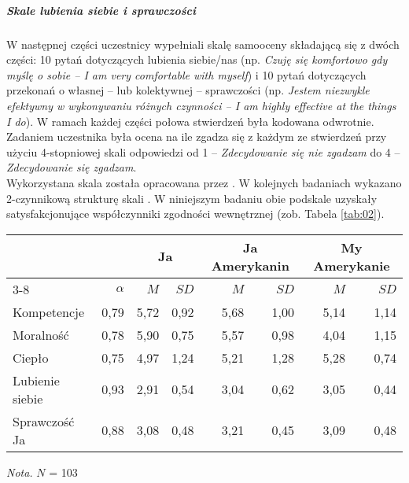 \documentclass[man]{apa6}
\begin{document}
\subparagraph{Skale lubienia siebie i sprawczości}
W następnej części uczestnicy wypełniali skalę samooceny składającą się z dwóch części: 10 pytań dotyczących lubienia siebie/nas (np. \emph{Czuję się komfortowo gdy myślę o sobie -- I am very comfortable with myself}) i 10 pytań dotyczących przekonań o własnej -- lub kolektywnej -- sprawczości (np. \emph{Jestem niezwykle efektywny w wykonywaniu różnych czynności -- I am highly effective at the things I do}). W ramach każdej części połowa stwierdzeń była kodowana odwrotnie. Zadaniem uczestnika była ocena na ile zgadza się z każdym ze stwierdzeń przy użyciu 4-stopniowej skali odpowiedzi od 1 -- \emph{Zdecydowanie się nie zgadzam} do 4 -- \emph{Zdecydowanie się zgadzam}.\\

Wykorzystana skala została opracowana przez \textcite{tafarodi1995self, tafarodi2001two}. W kolejnych badaniach wykazano 2-czynnikową strukturę skali \parencite{tafarodi2002decomposing}. W niniejszym badaniu obie podskale uzyskały satysfakcjonujące współczynniki zgodności wewnętrznej (zob. Tabela \ref{tab:02}).

\begin{table*}[htbp]
\vspace*{2em}
\centering
\begin{threeparttable}
\caption{Podstawowe statystyki opisowe dla skal użytych w Badaniu 2}
\label{tab:02}

\begin{tabular}{lrrrrrrr}

\midrule
\multicolumn{2}{c}{ } & \multicolumn{2}{c}{Ja} & \multicolumn{2}{c}{Ja Amerykanin} & \multicolumn{2}{c}{My Amerykanie} \\
\cline{3-8}
& $\alpha$ & $M$ & $SD$ & $M$ & $SD$ & $M$ & $SD$ \\
\midrule
Kompetencje & 0,79 & 5,72 & 0,92 & 5,68 & 1,00 & 5,14 & 1,14 \\
Moralność   & 0,78 & 5,90 & 0,75 & 5,57 & 0,98 & 4,04 & 1,15 \\
Ciepło      & 0,75 & 4,97 & 1,24 & 5,21 & 1,28 & 5,28 & 0,74 \\
Lubienie siebie & 0,93 & 2,91 & 0,54 & 3,04 & 0,62 & 3,05 & 0,44 \\
Sprawczość Ja   & 0,88 & 3,08 & 0,48 & 3,21 & 0,45 & 3,09 & 0,48 \\
\bottomrule

\end{tabular}

\begin{tablenotes}
{\small
\textit{Nota.} $N$ = 103
}
\end{tablenotes}
\end{threeparttable}
\end{table*}
\end{document}
